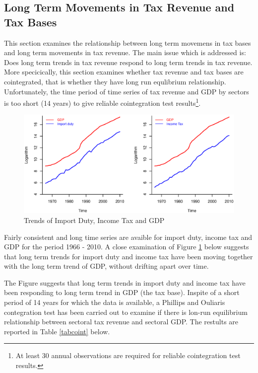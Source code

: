\documentclass[12pt,a4paper,final]{article}
\begin{document}
\subsection{Long Term Movements in Tax Revenue and Tax Bases}

This section examines the relationship between long term movemens in tax bases and long term movements in tax revenue.  The main issue which is addressed is: Does long term trends in tax revenue respond to long term trends in tax revenue. More specicically, this section examines whether tax revenue and tax bases are cointegrated, that is whether they have long run equlibrium relationship.  Unfortunately, the time period  of time series of tax revenue and GDP by sectors is too short (14 years) to give reliable cointegration test results\footnote{At least 30 annual observations are required for reliable cointegration test results.}. 

\begin{figure}[h]
\centering
\begin{small}
\caption{Trends of Import Duty, Income Tax and GDP}
\label{fig_grev}
\end{small}
\includegraphics[scale=0.501]{taxi.eps} 
\end{figure}

\newpage
Fairly consistent and long time series are avaible for import duty, income tax and GDP for the period 1966 - 2010.  A close examination of Figure \ref{fig_grev} below suggests that long term trends for import duty and income tax have been moving together with the long term trend of GDP, without drifting apart over time.

The Figure suggests that long term trends in import duty and income tax have been responding to long term trend in GDP (the tax base). Inspite of a short period of 14 years for which the data is available,  a Phillips and Ouliaris contegration test has been carried out to examine if there is lon-run equilibrium relationship between sectoral tax revenue and sectoral GDP. The restults are reported in Table \ref{tabcoint} below.
\end{document}

